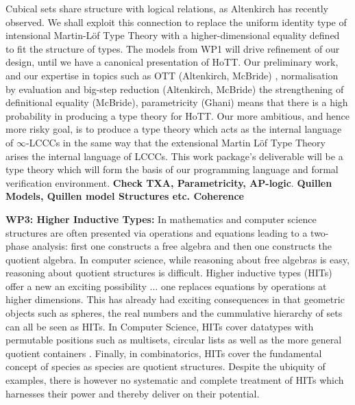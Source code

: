 \documentclass[a4paper,11pt]{article}
\begin{document}

Cubical sets share structure with logical relations, as Altenkirch has
recently observed. We shall exploit this connection to replace the
uniform identity type of intensional Martin-L\"of Type Theory with a
higher-dimensional equality defined to fit the structure of types. The
models from WP1 will drive refinement of our design, until we have a
canonical presentation of HoTT. Our preliminary work, and our
expertise in topics such as OTT (Altenkirch, McBride) \cite{alti:ott-conf}, normalisation
by evaluation and big-step reduction (Altenkirch, McBride) \cite{alti:ctcs95,alti:lics96,alti:flops04,txa:jtait} the
strengthening of definitional equality (McBride), parametricity
(Ghani) means that there is a high probability in producing a type
theory for HoTT. Our more ambitious, and hence more risky goal, is to
produce a type theory which acts as the internal language of
$\infty$-LCCCs in the same way that the extensional Martin L\"of Type
Theory arises the internal language of LCCCs.  This work package's
deliverable will be a type theory which will form the basis of our
programming language and formal verification environment. {\bf Check
  TXA, Parametricity, AP-logic}.  {\bf Quillen Models, Quillen model
  Structures etc. Coherence}


{\bf WP3: Higher Inductive Types:} In mathematics and computer science
structures are often presented via operations and equations leading to
a two-phase analysis: first one constructs a free algebra and then one
constructs the quotient algebra. In computer science, while reasoning
about free algebras is easy, reasoning about quotient structures is
difficult. Higher inductive types (HITs) offer a new an exciting
possibility ... one replaces equations by operations at higher
dimensions. This has already had exciting consequences in that
geometric objects such as spheres, the real numbers and the
cummulative hierarchy of sets can all be seen as HITs.  In Computer
Science, HITs cover datatypes with permutable positions such as
multisets, circular lists as well as the more general quotient
containers \cite{alti:mpc04,
  EPSRC_Containers}.  Finally, in combinatorics, HITs cover the
fundamental concept of species as species are quotient
structures. Despite the ubiquity of examples, there is however no
systematic and complete treatment of HITs which harnesses their power
and thereby deliver on their potential.
\end{document}
